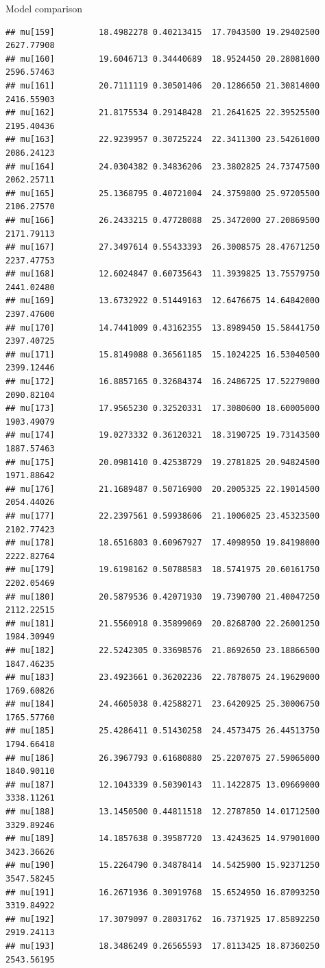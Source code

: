 \documentclass[
  ignorenonframetext,
]{beamer}
\begin{document}
\begin{frame}[fragile]{Model comparison}
\begin{verbatim}
## mu[159]         18.4982278 0.40213415  17.7043500 19.29402500 2627.77908
## mu[160]         19.6046713 0.34440689  18.9524450 20.28081000 2596.57463
## mu[161]         20.7111119 0.30501406  20.1286650 21.30814000 2416.55903
## mu[162]         21.8175534 0.29148428  21.2641625 22.39525500 2195.40436
## mu[163]         22.9239957 0.30725224  22.3411300 23.54261000 2086.24123
## mu[164]         24.0304382 0.34836206  23.3802825 24.73747500 2062.25711
## mu[165]         25.1368795 0.40721004  24.3759800 25.97205500 2106.27570
## mu[166]         26.2433215 0.47728088  25.3472000 27.20869500 2171.79113
## mu[167]         27.3497614 0.55433393  26.3008575 28.47671250 2237.47753
## mu[168]         12.6024847 0.60735643  11.3939825 13.75579750 2441.02480
## mu[169]         13.6732922 0.51449163  12.6476675 14.64842000 2397.47600
## mu[170]         14.7441009 0.43162355  13.8989450 15.58441750 2397.40725
## mu[171]         15.8149088 0.36561185  15.1024225 16.53040500 2399.12446
## mu[172]         16.8857165 0.32684374  16.2486725 17.52279000 2090.82104
## mu[173]         17.9565230 0.32520331  17.3080600 18.60005000 1903.49079
## mu[174]         19.0273332 0.36120321  18.3190725 19.73143500 1887.57463
## mu[175]         20.0981410 0.42538729  19.2781825 20.94824500 1971.88642
## mu[176]         21.1689487 0.50716900  20.2005325 22.19014500 2054.44026
## mu[177]         22.2397561 0.59938606  21.1006025 23.45323500 2102.77423
## mu[178]         18.6516803 0.60967927  17.4098950 19.84198000 2222.82764
## mu[179]         19.6198162 0.50788583  18.5741975 20.60161750 2202.05469
## mu[180]         20.5879536 0.42071930  19.7390700 21.40047250 2112.22515
## mu[181]         21.5560918 0.35899069  20.8268700 22.26001250 1984.30949
## mu[182]         22.5242305 0.33698576  21.8692650 23.18866500 1847.46235
## mu[183]         23.4923661 0.36202236  22.7878075 24.19629000 1769.60826
## mu[184]         24.4605038 0.42588271  23.6420925 25.30006750 1765.57760
## mu[185]         25.4286411 0.51430258  24.4573475 26.44513750 1794.66418
## mu[186]         26.3967793 0.61680880  25.2207075 27.59065000 1840.90110
## mu[187]         12.1043339 0.50390143  11.1422875 13.09669000 3338.11261
## mu[188]         13.1450500 0.44811518  12.2787850 14.01712500 3329.89246
## mu[189]         14.1857638 0.39587720  13.4243625 14.97901000 3423.36626
## mu[190]         15.2264790 0.34878414  14.5425900 15.92371250 3547.58245
## mu[191]         16.2671936 0.30919768  15.6524950 16.87093250 3319.84922
## mu[192]         17.3079097 0.28031762  16.7371925 17.85892250 2919.24113
## mu[193]         18.3486249 0.26565593  17.8113425 18.87360250 2543.56195

\end{verbatim}
\end{frame}
\end{document}
